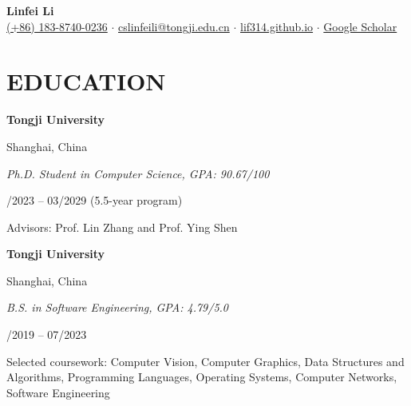\documentclass[11pt,a4paper]{article}
\newcommand{\twocolline}[2]{%
  \begin{minipage}[t]{0.76\textwidth}#1\end{minipage}\hfill%
  \begin{minipage}[t]{0.22\textwidth}\raggedleft #2\end{minipage}\par}
\newcommand{\datedline}[2]{\twocolline{\textbf{#1}}{#2}}
\newcommand{\roleline}[2]{\twocolline{\textit{#1}}{#2}\vspace{-0.15em}}
\begin{document}
\begin{center}
  {\LARGE\bfseries Linfei Li}\\[0.32em]
  \small
  \href{tel:+8618387400236}{(+86) 183-8740-0236}
  $\cdot$ \href{mailto:cslinfeili@tongji.edu.cn}{cslinfeili@tongji.edu.cn}
  $\cdot$ \href{https://lif314.github.io/}{lif314.github.io}
  $\cdot$ \href{https://scholar.google.com/citations?user=V-ugTYUAAAAJ&hl=en}{Google Scholar}
\end{center}
\vspace{-0.35em}

\section{EDUCATION}
\datedline{Tongji University}{Shanghai, China}
\roleline{Ph.D. Student in Computer Science, GPA: 90.67/100}{09/2023 -- 03/2029 (5.5-year program)}
Advisors: Prof. Lin Zhang and Prof. Ying Shen

\vspace{0.35em}
\datedline{Tongji University}{Shanghai, China}
\roleline{B.S. in Software Engineering, GPA: 4.79/5.0}{09/2019 -- 07/2023}
Selected coursework: Computer Vision, Computer Graphics, Data Structures and Algorithms, Programming Languages, Operating Systems, Computer Networks, Software Engineering
\end{document}
